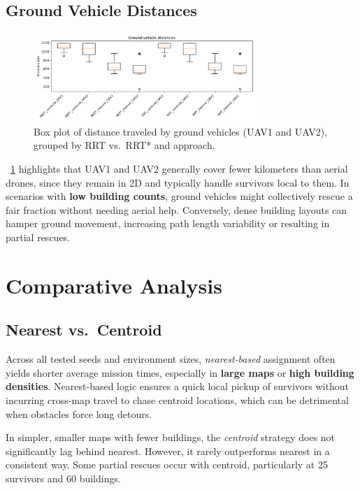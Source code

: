 \documentclass[12pt,a4paper]{report}
\begin{document}
\subsection{Ground Vehicle Distances}
\begin{figure}[H]
    \centering
    \includegraphics[width=0.75\textwidth]{figures/ground_distance_box.png}
    \caption{Box plot of distance traveled by ground vehicles (UAV1 and UAV2), 
             grouped by RRT vs.\ RRT* and approach.}
    \label{fig:ground_distance_box}
\end{figure}

\noindent
\figurename~\ref{fig:ground_distance_box} highlights that UAV1 and UAV2 generally 
cover fewer kilometers than aerial drones, since they remain in 2D and typically 
handle survivors local to them. In scenarios with \textbf{low building counts}, 
ground vehicles might collectively rescue a fair fraction without needing aerial help. 
Conversely, dense building layouts can hamper ground movement, increasing path length 
variability or resulting in partial rescues.

\section{Comparative Analysis}
\label{sec:analysis}
\subsection{Nearest vs.\ Centroid}
Across all tested seeds and environment sizes, \emph{nearest-based} assignment
often yields shorter average mission times, especially in \textbf{large maps} or
\textbf{high building densities}. Nearest-based logic ensures a quick local
pickup of survivors without incurring cross-map travel to chase centroid locations,
which can be detrimental when obstacles force long detours. 

In simpler, smaller maps with fewer buildings, the \emph{centroid} strategy does not
significantly lag behind nearest. However, it rarely outperforms nearest in a consistent
way. Some partial rescues occur with centroid, particularly at 25 survivors and 60 buildings.
\end{document}
